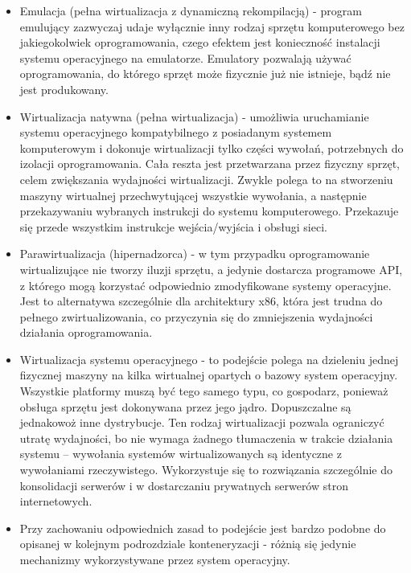 \documentclass[10pt,a4paper,titlepage,twoside]{report}
\begin{document}
\begin{itemize}
	\item Emulacja (pełna wirtualizacja z dynamiczną rekompilacją) - program emulujący zazwyczaj udaje wyłącznie inny rodzaj sprzętu komputerowego bez jakiegokolwiek oprogramowania, czego efektem jest konieczność instalacji systemu operacyjnego na emulatorze. Emulatory pozwalają używać oprogramowania, do którego sprzęt może fizycznie już nie istnieje, bądź nie jest produkowany.
	\item Wirtualizacja natywna (pełna wirtualizacja) - umożliwia uruchamianie systemu operacyjnego kompatybilnego z posiadanym systemem komputerowym i dokonuje wirtualizacji tylko części wywołań, potrzebnych do izolacji oprogramowania. Cała reszta jest przetwarzana przez fizyczny sprzęt, celem zwiększania wydajności wirtualizacji. Zwykle polega to na stworzeniu maszyny wirtualnej przechwytującej wszystkie wywołania, a następnie przekazywaniu wybranych instrukcji do systemu komputerowego. Przekazuje się przede wszystkim instrukcje wejścia/wyjścia i obsługi sieci.
	\item Parawirtualizacja (hipernadzorca) - w tym przypadku oprogramowanie wirtualizujące nie tworzy iluzji sprzętu, a jedynie dostarcza programowe API, z którego mogą korzystać odpowiednio zmodyfikowane systemy operacyjne. Jest to alternatywa szczególnie dla architektury x86, która jest trudna do pełnego zwirtualizowania, co przyczynia się do zmniejszenia wydajności działania oprogramowania.
	\item Wirtualizacja systemu operacyjnego - to podejście polega na dzieleniu jednej fizycznej maszyny na kilka wirtualnej opartych o bazowy system operacyjny. Wszystkie platformy muszą być tego samego typu, co gospodarz, ponieważ obsługa sprzętu jest dokonywana przez jego jądro. Dopuszczalne są jednakowoż inne dystrybucje. Ten rodzaj wirtualizacji pozwala ograniczyć utratę wydajności, bo nie wymaga żadnego tłumaczenia w trakcie działania systemu – wywołania systemów wirtualizowanych są identyczne z wywołaniami rzeczywistego. Wykorzystuje się to rozwiązania szczególnie do konsolidacji serwerów i w dostarczaniu prywatnych serwerów stron internetowych. 
	\item Przy zachowaniu odpowiednich zasad to podejście jest bardzo podobne do opisanej w kolejnym podrozdziale konteneryzacji - różnią się jedynie mechanizmy wykorzystywane przez system operacyjny.
\end{itemize}
\end{document}
